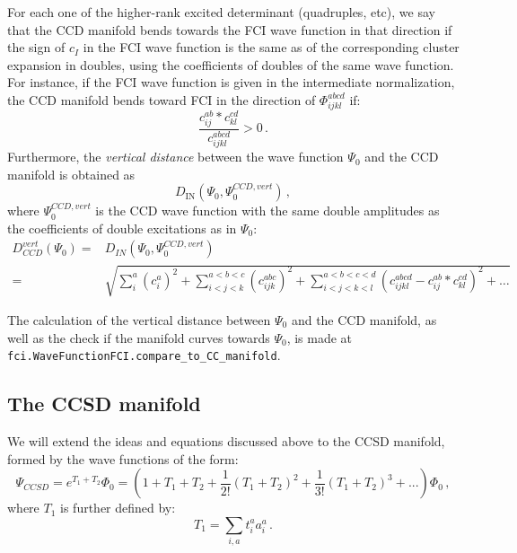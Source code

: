For each one of the higher-rank excited determinant (quadruples, etc),
we say that the CCD manifold bends towards the FCI wave function in that direction if
the sign of $c_I$ in the FCI wave function is the same as of the corresponding cluster expansion
in doubles, using the coefficients of doubles of the same wave function.
For instance, if the FCI wave function is given in the intermediate normalization,
the CCD manifold bends toward FCI in the direction of $\Phi_{ijkl}^{abcd}$ if:
\begin{equation}
  \frac{c_{ij}^{ab} * c_{kl}^{cd}}{c_{ijkl}^{abcd}} > 0\,.
\end{equation}
Furthermore,
the \emph{vertical distance} between the wave function $\Psi_0$ and the CCD manifold is obtained as
\begin{equation}
  D_\text{IN}(\Psi_0, \Psi_0^{CCD,vert})\,,
\end{equation}
where $\Psi_0^{CCD,vert}$ is the CCD wave function
with the same double amplitudes as the coefficients of double excitations as in $\Psi_0$:
\begin{equation}
  \begin{split}
    D_{CCD}^{vert}(\Psi_0) =& D_{IN}(\Psi_0, \Psi_0^{CCD,vert})\\
    =& \sqrt{
      \sum_i^a (c_i^a)^2
      + \sum_{i<j<k}^{a<b<c} (c_{ijk}^{abc})^2
      + \sum_{i<j<k<l}^{a<b<c<d}(c_{ijkl}^{abcd} - c_{ij}^{ab} * c_{kl}^{cd})^2 + \dots
    }
  \end{split}
\end{equation}

The calculation of the vertical distance between $\Psi_0$ and the CCD manifold,
as well as the check if the manifold curves towards $\Psi_0$,
is made at \texttt{fci.WaveFunctionFCI.compare\_to\_CC\_manifold}.

\subsection{The CCSD manifold}
We will extend the ideas and equations discussed above to the CCSD manifold,
formed by the wave functions of the form:
\begin{equation}
  \Psi_{CCSD} = e^{T_1 + T_2} \Phi_0 =
  \left(1 + T_1 + T_2 + \frac{1}{2!}(T_1 + T_2)^2 + \frac{1}{3!}(T_1 + T_2)^3 + ...\right) \Phi_0\,,
\end{equation}
where $T_1$ is further defined by:
\begin{equation}
  T_1 = \sum_{i,a} t_i^a a_i^a\,.
\end{equation}

